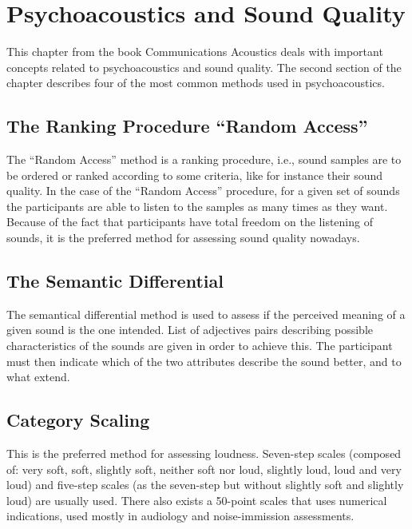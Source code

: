 \section{Psychoacoustics and Sound Quality}

This chapter from the book Communications Acoustics
\cite{Blauert2005Communication} deals with important concepts related to
psychoacoustics and sound quality. The second section of the chapter describes
four of the most common methods used in psychoacoustics.

\subsection{The Ranking Procedure ``Random Access''}

The ``Random Access'' method is a ranking procedure, i.e., sound samples are to
be ordered or ranked according to some criteria, like for instance their sound
quality. In the case of the ``Random Access'' procedure, for a given set of
sounds the participants are able to listen to the samples as many times as they
want. Because of the fact that participants have total freedom on the listening
of sounds, it is the preferred method for assessing sound quality nowadays.

\subsection{The Semantic Differential}

The semantical differential method is used to assess if the perceived meaning of
a given sound is the one intended. List of adjectives pairs describing possible
characteristics of the sounds are given in order to achieve this. The
participant must then indicate which of the two attributes describe the sound
better, and to what extend.

\subsection{Category Scaling}

This is the preferred method for assessing loudness. Seven-step scales (composed
of: very soft, soft, slightly soft, neither soft nor loud, slightly loud, loud
and very loud) and five-step scales (as the seven-step but without slightly soft
and slightly loud) are usually used. There also exists a 50-point scales that
uses numerical indications, used mostly in audiology and noise-immission
assessments.

